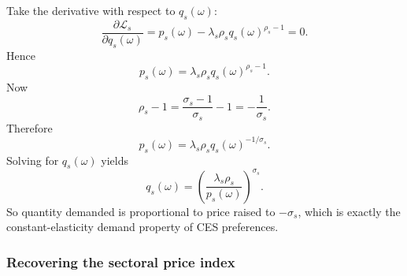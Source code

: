 \documentclass[11pt]{article}
\begin{document}
Take the derivative with respect to \(q_s(\omega)\):
\begin{equation}
\frac{\partial \mathcal{L}_s}{\partial q_s(\omega)} = p_s(\omega) - \lambda_s\rho_s q_s(\omega)^{\rho_s-1}=0.
\end{equation}
Hence
\begin{equation}
p_s(\omega) = \lambda_s\rho_s q_s(\omega)^{\rho_s-1}.
\end{equation}
Now
\begin{equation}
\rho_s-1 = \frac{\sigma_s-1}{\sigma_s}-1 = -\frac{1}{\sigma_s}.
\end{equation}
Therefore
\begin{equation}
p_s(\omega)=\lambda_s\rho_s q_s(\omega)^{-1/\sigma_s}.
\end{equation}
Solving for \(q_s(\omega)\) yields
\begin{equation}
q_s(\omega)=\left(\frac{\lambda_s\rho_s}{p_s(\omega)}\right)^{\sigma_s}.
\end{equation}
So quantity demanded is proportional to price raised to \(-\sigma_s\), which is exactly the constant-elasticity demand property of CES preferences.

\subsubsection{Recovering the sectoral price index}
\end{document}
